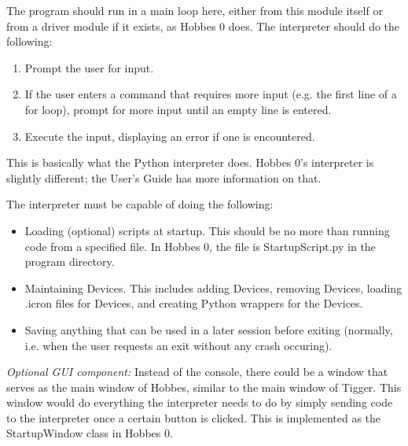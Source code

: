 \documentclass[12pt,letterpaper]{article}
\begin{document}
The program should run in a main loop here, either from this module itself or from a driver module if it exists, as Hobbes 0 does. The interpreter should do the following:

\begin{enumerate}

\item Prompt the user for input.

\item If the user enters a command that requires more input (e.g. the first line of a for loop), prompt for more input until an empty line is entered.

\item Execute the input, displaying an error if one is encountered.

\end{enumerate}

This is basically what the Python interpreter does. Hobbes 0's interpreter is slightly different; the User's Guide has more information on that.

The interpreter must be capable of doing the following:

\begin{itemize}

\item Loading (optional) scripts at startup. This should be no more than running code from a specified file. In Hobbes 0, the file is StartupScript.py in the program directory.

\item Maintaining Devices. This includes adding Devices, removing Devices, loading .icron files for Devices, and creating Python wrappers for the Devices.

\item Saving anything that can be used in a later session before exiting (normally, i.e. when the user requests an exit without any crash occuring).

\end{itemize}


\emph{Optional GUI component:} Instead of the console, there could be a window that serves as the main window of Hobbes, similar to the main window of Tigger. This window would do everything the interpreter needs to do by simply sending code to the interpreter once a certain button is clicked. This is implemented as the StartupWindow class in Hobbes 0.

\setcounter{subsubsection}{-1}
\end{document}
